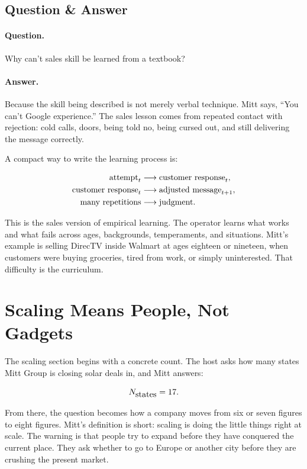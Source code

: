 \subsection{Question \& Answer}

\paragraph{Question.}
Why can't sales skill be learned from a textbook?

\paragraph{Answer.}
Because the skill being described is not merely verbal technique. Mitt says, ``You can't Google experience.'' The sales lesson comes from repeated contact with rejection: cold calls, doors, being told no, being cursed out, and still delivering the message correctly.

A compact way to write the learning process is:

\begin{align}
  \hbox{attempt}_{t} &\longrightarrow \hbox{customer response}_{t},\\
  \hbox{customer response}_{t} &\longrightarrow \hbox{adjusted message}_{t+1},\\
  \hbox{many repetitions} &\longrightarrow \hbox{judgment}.
\end{align}

This is the sales version of empirical learning. The operator learns what works and what fails across ages, backgrounds, temperaments, and situations. Mitt's example is selling DirecTV inside Walmart at ages eighteen or nineteen, when customers were buying groceries, tired from work, or simply uninterested. That difficulty is the curriculum.

\section{Scaling Means People, Not Gadgets}

The scaling section begins with a concrete count. The host asks how many states Mitt Group is closing solar deals in, and Mitt answers:

\begin{equation}
  N_{\hbox{states}} = 17.
\end{equation}

From there, the question becomes how a company moves from six or seven figures to eight figures. Mitt's definition is short: scaling is doing the little things right at scale. The warning is that people try to expand before they have conquered the current place. They ask whether to go to Europe or another city before they are crushing the present market.

